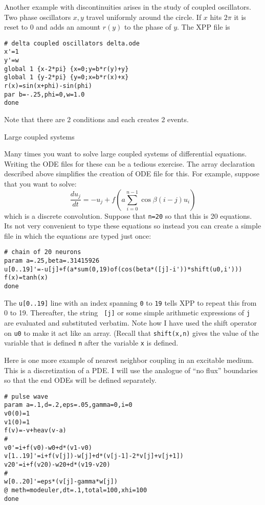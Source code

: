 \documentclass{article}
\newcommand{\tc}[1]{\addcontentsline{toc}{subsection}{#1}}
\begin{document}
Another example with discontinuities arises in the study of coupled
oscillators.  Two phase oscillators $x,y$ travel uniformly around the
circle.  If $x$ hits $2\pi$ it is  reset to 0 and adds an amount
$r(y)$ to the phase of $y.$  The XPP file is
\begin{verbatim}
# delta coupled oscillators delta.ode
x'=1
y'=w
global 1 {x-2*pi} {x=0;y=b*r(y)+y}
global 1 {y-2*pi} {y=0;x=b*r(x)+x}
r(x)=sin(x+phi)-sin(phi)
par b=-.25,phi=0,w=1.0
done
\end{verbatim}
Note that there are 2 conditions and each creates 2 events.
\medskip

\tc{Large coupled systems}\begin{center}
Large coupled systems
\end{center}
Many times you want to solve large coupled systems of differential
equations.  Writing the ODE files for these can be a tedious exercise.
The array declaration described above simplifies the creation of ODE
file for this.
For
example, suppose that you want to solve:
\[
\frac{du_j}{dt} = -u_j + f(a\sum_{i=0}^{n-1}\cos\beta(i-j) u_i)
\]
which is a discrete convolution.  Suppose that {\tt n=20} so that this
is 20 equations.  Its not very convenient to type these equations so
instead you can create a simple file in which the equations are typed
just once:
\begin{verbatim}
# chain of 20 neurons
param a=.25,beta=.31415926
u[0..19]'=-u[j]+f(a*sum(0,19)of(cos(beta*([j]-i'))*shift(u0,i')))
f(x)=tanh(x)
done
\end{verbatim}
The {\tt u[0..19]} line with an index spanning {\tt 0} to {\tt 19}
tells XPP to repeat this from 0 to 19.  Thereafter, the string {\tt
[j]} or some simple arithmetic expressions of {\tt j} are evaluated
and substituted verbatim.
Note how I have used the shift operator on {\tt u0} to make it act like
an array. (Recall that {\tt shift(x,n)} gives the value of the
variable that is defined {\tt n} after the variable {\tt x} is
defined.

Here is one more example of nearest neighbor coupling in an excitable
medium.  This is a discretization of a PDE.  I will use the analogue
of ``no flux'' boundaries so that the end ODEs will be defined separately.
\begin{verbatim}
# pulse wave
param a=.1,d=.2,eps=.05,gamma=0,i=0
v0(0)=1
v1(0)=1
f(v)=-v+heav(v-a)
#
v0'=i+f(v0)-w0+d*(v1-v0)
v[1..19]'=i+f(v[j])-w[j]+d*(v[j-1]-2*v[j]+v[j+1])
v20'=i+f(v20)-w20+d*(v19-v20)
#
w[0..20]'=eps*(v[j]-gamma*w[j])
@ meth=modeuler,dt=.1,total=100,xhi=100
done
\end{verbatim}
\end{document}
